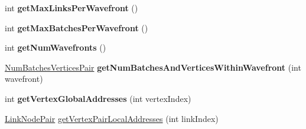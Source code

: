 \begin{DoxyCompactItemize}
\item 
\hypertarget{classbt_soft_body_link_data_open_c_l_s_i_m_d_aware_aa06ef3fc9271423186db2993834acf13}{int {\bfseries get\+Max\+Links\+Per\+Wavefront} ()}\label{classbt_soft_body_link_data_open_c_l_s_i_m_d_aware_aa06ef3fc9271423186db2993834acf13}

\item 
\hypertarget{classbt_soft_body_link_data_open_c_l_s_i_m_d_aware_aa70ec1e6f3a5c2e00e2bb7e9ca77487f}{int {\bfseries get\+Max\+Batches\+Per\+Wavefront} ()}\label{classbt_soft_body_link_data_open_c_l_s_i_m_d_aware_aa70ec1e6f3a5c2e00e2bb7e9ca77487f}

\item 
\hypertarget{classbt_soft_body_link_data_open_c_l_s_i_m_d_aware_a9c043815f72b537dfa3dce9b23efbc94}{int {\bfseries get\+Num\+Wavefronts} ()}\label{classbt_soft_body_link_data_open_c_l_s_i_m_d_aware_a9c043815f72b537dfa3dce9b23efbc94}

\item 
\hypertarget{classbt_soft_body_link_data_open_c_l_s_i_m_d_aware_a9fe26bb2f2461f8a34157eac83d30e0c}{\hyperlink{structbt_soft_body_link_data_open_c_l_s_i_m_d_aware_1_1_num_batches_vertices_pair}{Num\+Batches\+Vertices\+Pair} {\bfseries get\+Num\+Batches\+And\+Vertices\+Within\+Wavefront} (int wavefront)}\label{classbt_soft_body_link_data_open_c_l_s_i_m_d_aware_a9fe26bb2f2461f8a34157eac83d30e0c}

\item 
\hypertarget{classbt_soft_body_link_data_open_c_l_s_i_m_d_aware_a755a465a5e26910287ddbed34ae96a5c}{int {\bfseries get\+Vertex\+Global\+Addresses} (int vertex\+Index)}\label{classbt_soft_body_link_data_open_c_l_s_i_m_d_aware_a755a465a5e26910287ddbed34ae96a5c}

\item 
\hyperlink{classbt_soft_body_link_data_1_1_link_node_pair}{Link\+Node\+Pair} \hyperlink{classbt_soft_body_link_data_open_c_l_s_i_m_d_aware_a02bb3654ae8ced9acdae914a23e0ae2b}{get\+Vertex\+Pair\+Local\+Addresses} (int link\+Index)
\end{DoxyCompactItemize}
